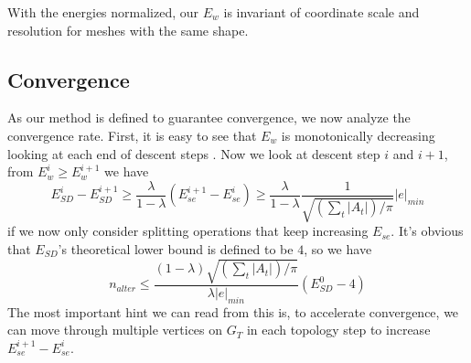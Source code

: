 With the energies normalized, our $E_w$ is invariant of coordinate scale and resolution for meshes with the same shape.





\subsection{Convergence}
\label{sec:convergence}

As our method is defined to guarantee convergence, we now analyze the convergence rate. First, it is easy to see that $E_w$ is monotonically decreasing looking at each end of descent steps . Now we look at descent step $i$ and $i+1$, from $E^i_w \geq E^{i+1}_w$ we have
\[ E^i_{SD} - E^{i+1}_{SD} \geq \frac{\lambda}{1-\lambda} (E^{i+1}_{se} - E^i_{se}) \geq \frac{\lambda}{1-\lambda} \frac{1}{\sqrt{(\sum_t |A_t|)/\pi}} |e|_{min} \]
if we now only consider splitting operations that keep increasing $E_{se}$. It's obvious that $E_{SD}$'s theoretical lower bound is defined to be $4$, so we have
\[ n_{alter} \leq \frac{(1-\lambda)\sqrt{(\sum_t |A_t|)/\pi}}{\lambda|e|_{min}} (E^0_{SD} - 4) \]
The most important hint we can read from this is, to accelerate convergence, we can move through multiple vertices on $G_T$ in each topology step to increase $E^{i+1}_{se} - E^i_{se}$.

